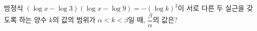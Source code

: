 방정식 $(\log x-\log 3)(\log x-\log 9)=-(\log k)^{2}$이 서로 다른 두 실근을 갖도록 하는 양수 $k$의 값의 범위가 $\alpha<k<\beta$일 때, $\dfrac{\beta}{\alpha}$의 값은?
